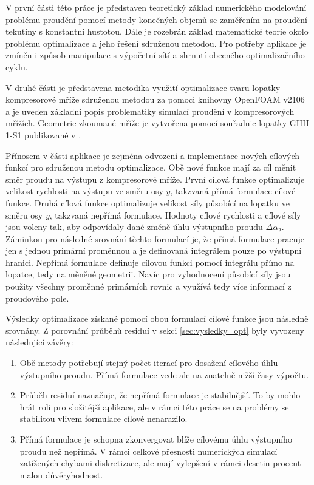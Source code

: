V první části této práce je představen teoretický základ numerického modelování problému proudění pomocí metody konečných objemů se zaměřením na proudění tekutiny s konstantní hustotou. Dále je rozebrán základ matematické teorie okolo problému optimalizace a jeho řešení sdruženou metodou. Pro potřeby aplikace je zmíněn i způsob manipulace s výpočetní sítí a shrnutí obecného optimalizačního cyklu.

V druhé části je představena metodika využití optimalizace tvaru lopatky kompresorové mříže sdruženou metodou za pomoci knihovny OpenFOAM v2106 a je uveden základní popis problematiky simulací proudění v kompresorových mřížích. Geometrie zkoumané mříže je vytvořena pomocí souřadnic lopatky GHH 1-S1 publikované v \cite{steinert1990design}.

Přínosem v části aplikace je zejména odvození a implementace nových cílových funkcí pro sdruženou metodu optimalizace. Obě nové funkce mají za cíl měnit směr proudu na výstupu z kompresorové mříže. První cílová funkce optimalizuje velikost rychlosti na výstupu ve směru osy $ y $, takzvaná přímá formulace cílové funkce. Druhá cílová funkce optimalizuje velikost síly působící na lopatku ve směru osy $ y $, takzvaná nepřímá formulace. Hodnoty cílové rychlosti a cílové síly jsou voleny tak, aby odpovídaly dané změně úhlu výstupního proudu $ \Delta\alpha_{2} $. Záminkou pro následné srovnání těchto formulací je, že přímá formulace pracuje jen s jednou primární proměnnou a je definovaná integrálem pouze po výstupní hranici. Nepřímá formulace definuje cílovou funkci pomocí integrálu přímo na lopatce, tedy na měněné geometrii. Navíc pro vyhodnocení působící síly jsou použity všechny proměnné primárních rovnic a využívá tedy více informací z proudového pole.

Výsledky optimalizace získané pomocí obou formulací cílové funkce jsou následně srovnány. Z porovnání průběhů residuí v sekci \ref{sec:vysledky_opt} byly vyvozeny následující závěry:
\begin{enumerate}
	\item Obě metody potřebují stejný počet iterací pro dosažení cílového úhlu výstupního proudu. Přímá formulace vede ale na znatelně nižší časy výpočtu.
	\item Průběh residuí naznačuje, že nepřímá formulace je stabilnější. To by mohlo hrát roli pro složitější aplikace, ale v rámci této práce se na problémy se stabilitou vlivem formulace cílové nenarazilo.
	\item Přímá formulace je schopna zkonvergovat blíže cílovému úhlu výstupního proudu než nepřímá. V rámci celkové přesnosti numerických simulací zatížených chybami diskretizace, ale mají vylepšení v rámci desetin procent malou důvěryhodnost.
\end{enumerate}

